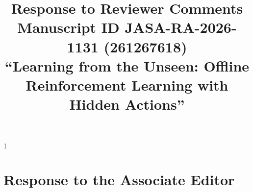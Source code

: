 \documentclass[12pt]{article}
\newcommand{\0}{\boldsymbol{0}}
\theoremstyle{definition}
\newcommand{\papertitle}{Response to Reviewer Comments}
\newcommand{\manuscripttitle}{Learning from the Unseen: Offline Reinforcement Learning with Hidden Actions}
\newcommand{\blind}{1}
\newcommand{\reviewcomment}[1]{\par\begingroup\itshape\noindent\textbf{#1}:\ }
\newcommand{\reviewresponse}{\par\endgroup\noindent\textbf{\textit{Response}}:\ }
\begin{document}
\def\spacingset#1{\renewcommand{\baselinestretch}{#1}\small\normalsize}
\spacingset{1.3}
\blind
{\title{\papertitle\\[0.6em]
\large Manuscript ID  JASA-RA-2026-1131 (261267618) \\[0.35em]
\large ``\manuscripttitle''}
\author{}
\date{}
\maketitle
}\fi
\spacingset{1.7}








\section*{Response to the Associate Editor}
\end{document}
